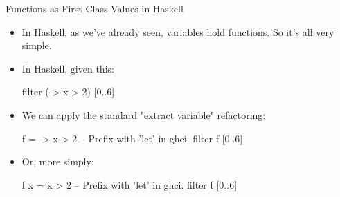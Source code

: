 \documentclass[xcolor=dvipsnames]{beamer}          %
\begin{document}
\begin{frame}[fragile]{Functions as First Class Values in Haskell}
\begin{itemize}
    \item In Haskell, as we've already seen, variables hold functions.
        So it's all very simple.
    \item In Haskell, given this:
        \begin{hlisting}
            filter (\x -> x > 2) [0..6]
        \end{hlisting}
    \item We can apply the standard "extract variable" refactoring:
        \begin{hlisting}
            f = \x -> x > 2     -- Prefix with 'let' in ghci.
            filter f [0..6]
        \end{hlisting}
    \item Or, more simply:
        \begin{hlisting}
            f x = x > 2         -- Prefix with 'let' in ghci.
            filter f [0..6]
        \end{hlisting}
\end{itemize}
\end{frame}
\end{document}
